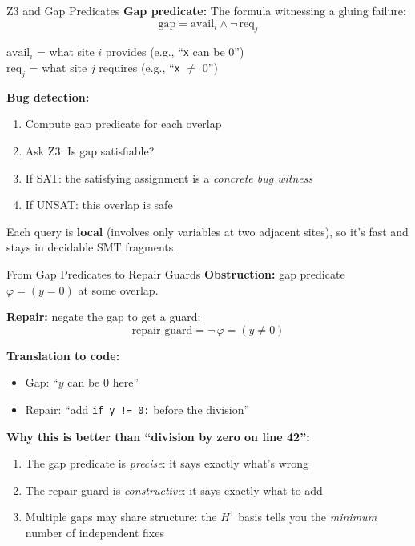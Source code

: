 \documentclass[aspectratio=169,10pt]{beamer}
\begin{document}
\begin{frame}{Z3 and Gap Predicates}
\textbf{Gap predicate:} The formula witnessing a gluing failure:
\[
\text{gap} = \text{avail}_i \wedge \lnot\, \text{req}_j
\]

$\text{avail}_i$ = what site $i$ provides (e.g., ``\texttt{x} can be 0'')\\
$\text{req}_j$ = what site $j$ requires (e.g., ``\texttt{x} $\neq$ 0'')

\vspace{0.3em}
\textbf{Bug detection:}
\begin{enumerate}
  \item Compute gap predicate for each overlap
  \item Ask Z3: Is $\text{gap}$ satisfiable?
  \item If SAT: the satisfying assignment is a \emph{concrete bug witness}
  \item If UNSAT: this overlap is safe
\end{enumerate}

\vspace{0.3em}
Each query is \textbf{local} (involves only variables at two adjacent sites), so it's fast and stays in decidable SMT fragments.
\end{frame}

\begin{frame}{From Gap Predicates to Repair Guards}
\textbf{Obstruction:} gap predicate $\varphi = (y = 0)$ at some overlap.

\textbf{Repair:} negate the gap to get a guard:
\[
\text{repair\_guard} = \lnot\,\varphi = (y \neq 0)
\]

\textbf{Translation to code:}
\begin{itemize}
  \item Gap: ``$y$ can be $0$ here''
  \item Repair: ``add \texttt{if y != 0:} before the division''
\end{itemize}

\vspace{0.3em}
\textbf{Why this is better than ``division by zero on line 42'':}
\begin{enumerate}
  \item The gap predicate is \emph{precise}: it says exactly what's wrong
  \item The repair guard is \emph{constructive}: it says exactly what to add
  \item Multiple gaps may share structure: the $H^1$ basis tells you the \emph{minimum} number of independent fixes
\end{enumerate}
\end{frame}
\end{document}
